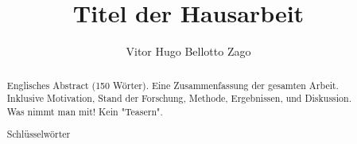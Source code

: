\documentclass[runningheads,a4paper]{llncs}
\newcommand{\keywords}[1]{\par\addvspace\baselineskip
\noindent\keywordname\enspace\ignorespaces#1}
\begin{document}
\aicescoverpage

\mainmatter  %
\title{Titel der Hausarbeit}



\author{Vitor Hugo Bellotto Zago}

%
%


\maketitle


\begin{abstract}

Englisches Abstract (150 Wörter). Eine Zusammenfassung der gesamten Arbeit. 
Inklusive Motivation, Stand der Forschung, Methode, Ergebnissen, und Diskussion.
Was nimmt man mit! Kein "Teasern".


\keywords{5 Schlüsselwörter}
\end{abstract}






\makeatletter
\renewcommand\@biblabel[1]{#1. }
\makeatother

\end{document}
